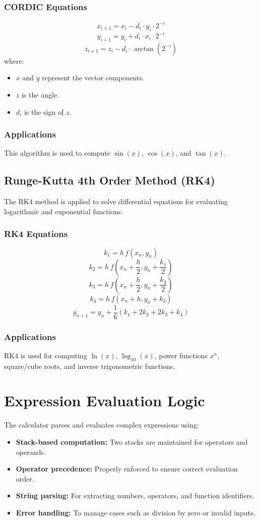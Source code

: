 \documentclass[a4paper,12pt]{article}
\begin{document}
\subsubsection{CORDIC Equations}
\[
x_{i+1} = x_i - d_i \cdot y_i \cdot 2^{-i}
\]
\[
y_{i+1} = y_i + d_i \cdot x_i \cdot 2^{-i}
\]
\[
z_{i+1} = z_i - d_i \cdot \arctan(2^{-i})
\]
where:
\begin{itemize}
    \item \(x\) and \(y\) represent the vector components.
    \item \(z\) is the angle.
    \item \(d_i\) is the sign of \(z\).
\end{itemize}

\subsubsection{Applications}
This algorithm is used to compute $\sin(x)$, $\cos(x)$, and $\tan(x)$.

\subsection{Runge-Kutta 4th Order Method (RK4)}
The RK4 method is applied to solve differential equations for evaluating logarithmic and exponential functions.

\subsubsection{RK4 Equations}
\[
k_1 = h\,f(x_n, y_n)
\]
\[
k_2 = h\,f\left(x_n + \frac{h}{2}, y_n + \frac{k_1}{2}\right)
\]
\[
k_3 = h\,f\left(x_n + \frac{h}{2}, y_n + \frac{k_2}{2}\right)
\]
\[
k_4 = h\,f(x_n + h, y_n + k_3)
\]
\[
y_{n+1} = y_n + \frac{1}{6}(k_1 + 2k_2 + 2k_3 + k_4)
\]

\subsubsection{Applications}
RK4 is used for computing $\ln(x)$, $\log_{10}(x)$, power functions \( x^n \), square/cube roots, and inverse trigonometric functions.

\section{Expression Evaluation Logic}
The calculator parses and evaluates complex expressions using:
\begin{itemize}
    \item \textbf{Stack-based computation:} Two stacks are maintained for operators and operands.
    \item \textbf{Operator precedence:} Properly enforced to ensure correct evaluation order.
    \item \textbf{String parsing:} For extracting numbers, operators, and function identifiers.
    \item \textbf{Error handling:} To manage cases such as division by zero or invalid inputs.
\end{itemize}
\end{document}

